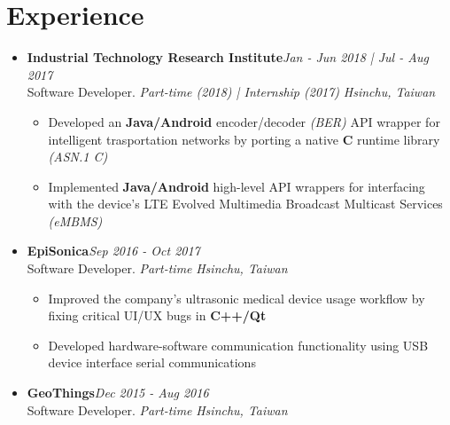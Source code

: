 \section{\sectionheading Experience}

\begin{itemize}[leftmargin=0pt, label={}]%

\item{
{\sectionheading\large{\textbf{Industrial Technology Research Institute}}}\hfill {\sectionheading\small{\textit{Jan - Jun 2018 | Jul - Aug 2017}}}\\
{\sectionheading\small{Software Developer. \textit{Part-time (2018) | Internship (2017)}}}\hfill
{\sectionheading\small{\textit{Hsinchu, Taiwan}}}

    \vspace{-6pt}
    \begin{itemize}[label=\textbullet, leftmargin=*, noitemsep]
        \item{Developed an \textbf{Java/Android} encoder/decoder \textit{(BER)} API wrapper for intelligent trasportation networks by porting a native \textbf{C} runtime library \textit{(ASN.1 C)}}
        \item{Implemented \textbf{Java/Android} high-level API wrappers for interfacing with the device's LTE Evolved Multimedia Broadcast Multicast Services \textit{(eMBMS)}}
    \end{itemize}
}

\item{
{\sectionheading\large{\textbf{EpiSonica}}}\hfill {\sectionheading\small{\textit{Sep 2016 - Oct 2017}}}\\
{\sectionheading\small{Software Developer. \textit{Part-time}}}\hfill
{\sectionheading\small{\textit{Hsinchu, Taiwan}}}

    \vspace{-6pt}
    \begin{itemize}[label=\textbullet, leftmargin=*, noitemsep]%
        \item{Improved the company's ultrasonic medical device usage workflow by fixing critical UI/UX bugs in \textbf{C++/Qt}}
        \item{Developed hardware-software communication functionality using USB device interface serial communications}
    \end{itemize}
}

\item{
{\sectionheading\large{\textbf{GeoThings}}}\hfill {\sectionheading\small{\textit{Dec 2015 - Aug 2016}}}\\
{\sectionheading\small{Software Developer. \textit{Part-time}}}\hfill
{\sectionheading\small{\textit{Hsinchu, Taiwan}}}

}
\end{itemize}
